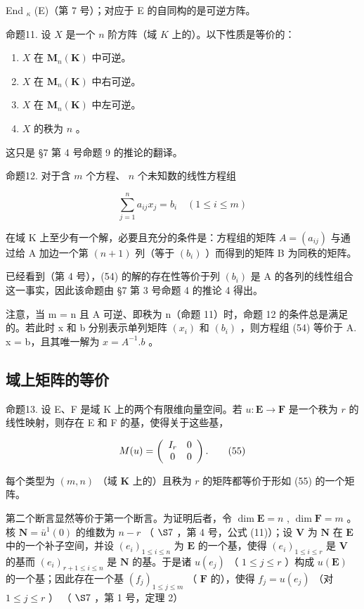 End \(_{\kappa}\) (E)（第 7 号）；对应于 E 的自同构的是可逆方阵。

命题11. 设 \(X\) 是一个 \(n\) 阶方阵（域 \(K\) 上的）。以下性质是等价的：

\begin{enumerate}
\def\labelenumi{(\alph{enumi})}
\item
  \(X\) 在 \(\mathbf{M}_n(\mathbf{K})\) 中可逆。
\item
  \(X\) 在 \(\mathbf{M}_n(\mathbf{K})\) 中右可逆。
\item
  \(X\) 在 \(\mathbf{M}_n(\mathbf{K})\) 中左可逆。
\item
  \(X\) 的秩为 \(n\) 。
\end{enumerate}

这只是 §7 第 4 号命题 9 的推论的翻译。

命题12. 对于含 \(m\) 个方程、 \(n\) 个未知数的线性方程组

\[
\sum_ {j = 1} ^ {n} a _ {i j} x _ {j} = b _ {i} \quad (1 \leqslant i \leqslant m)\tag{54}
\]

在域 K 上至少有一个解，必要且充分的条件是：方程组的矩阵 \(A = (a_{ij})\) 与通过给 A 加边一个第 \((n + 1)\) 列（等于 \((b_{i})\) ）而得到的矩阵 B 为同秩的矩阵。

已经看到（第 4 号），(54) 的解的存在性等价于列 \((b_{i})\) 是 A 的各列的线性组合这一事实，因此该命题由 §7 第 3 号命题 4 的推论 4 得出。

注意，当 m = n 且 A 可逆、即秩为 n（命题 11）时，命题 12 的条件总是满足的。若此时 x 和 b 分别表示单列矩阵 \((x_{i})\) 和 \((b_{i})\) ，则方程组 (54) 等价于 A. x = b，且其唯一解为 \(x = A^{-1}.b\) 。

\subsection{域上矩阵的等价}

命题13. 设 E、F 是域 K 上的两个有限维向量空间。若 \(u: \mathbf{E} \to \mathbf{F}\) 是一个秩为 \(r\) 的线性映射，则存在 E 和 F 的基，使得关于这些基，

\[
M (u) = \left( \begin{array}{c c} I _ {r} & 0 \\ 0 & 0 \end{array} \right).\tag{55}
\]

每个类型为 \((m, n)\) （域 \(\mathbf{K}\) 上的）且秩为 \(r\) 的矩阵都等价于形如 (55) 的一个矩阵。

第二个断言显然等价于第一个断言。为证明后者，令 \(\dim \mathbf{E} = n\) , \(\dim \mathbf{F} = m\) 。核 \(\mathbf{N} = \bar{u}^{1}(0)\) 的维数为 \(n - r\) （ \(\S 7\) ，第 4 号，公式 (11)）；设 \(\mathbf{V}\) 为 \(\mathbf{N}\) 在 \(\mathbf{E}\) 中的一个补子空间，并设 \((e_i)_{1 \leqslant i \leqslant n}\) 为 \(\mathbf{E}\) 的一个基，使得 \((e_i)_{1 \leqslant i \leqslant r}\) 是 \(\mathbf{V}\) 的基而 \((e_i)_{r + 1 \leqslant i \leqslant n}\) 是 \(\mathbf{N}\) 的基。于是诸 \(u(e_j)\) （ \(1 \leqslant j \leqslant r\) ）构成 \(u(\mathbf{E})\) 的一个基；因此存在一个基 \((f_j)_{1 \leqslant j \leqslant m}\) （ \(\mathbf{F}\) 的），使得 \(f_j = u(e_j)\) （对 \(1 \leqslant j \leqslant r\) ） （ \(\S 7\) ，第 1 号，定理 2）

